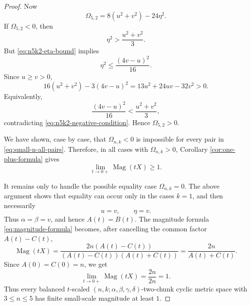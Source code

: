 \documentclass[11pt]{amsart}
\numberwithin{equation}{section}
\theoremstyle{definition}
\theoremstyle{remark}
\DeclareMathOperator{\Mag}{Mag}
\begin{document}
\begin{proof}
Now
\begin{equation}\label{eq:n5k2-Omega}
\Omega_{5,2}=8(u^2+v^2)-24\eta^2.
\end{equation}
If \(\Omega_{5,2}<0\), then
\begin{equation}\label{eq:n5k2-negative-condition}
\eta^2>\frac{u^2+v^2}{3}.
\end{equation}
But \eqref{eq:n5k2-eta-bound} implies
\begin{equation}\label{eq:n5k2-upper-square}
\eta^2\leq \frac{(4v-u)^2}{16}.
\end{equation}
Since \(u\geq v>0\),
\begin{equation}\label{eq:n5k2-elementary-positive}
16(u^2+v^2)-3(4v-u)^2
=
13u^2+24uv-32v^2
>0.
\end{equation}
Equivalently,
\begin{equation}\label{eq:n5k2-contradiction}
\frac{(4v-u)^2}{16}
<
\frac{u^2+v^2}{3},
\end{equation}
contradicting \eqref{eq:n5k2-negative-condition}.  Hence
\(\Omega_{5,2}>0\).

We have shown, case by case, that \(\Omega_{n,k}<0\) is impossible for every
pair in \eqref{eq:small-n-all-pairs}.  Therefore, in all cases with
\(\Omega_{n,k}>0\), Corollary \ref{cor:one-plus-formula} gives
\[
\lim_{t\to 0+}\Mag(tX)\geq 1.
\]

It remains only to handle the possible equality case \(\Omega_{n,k}=0\).
The above argument shows that equality can occur only in the cases \(k=1\),
and then necessarily
\begin{equation}\label{eq:k1-equality-case}
u=v,
\qquad
\eta=v.
\end{equation}
Thus \(\alpha=\beta=v\), and hence \(A(t)=B(t)\).  The magnitude formula
\eqref{eq:magnitude-formula} becomes, after cancelling the common factor
\(A(t)-C(t)\),
\begin{equation}\label{eq:k1-degenerate-cancellation}
\Mag(tX)
=
\frac{2n(A(t)-C(t))}{(A(t)-C(t))(A(t)+C(t))}
=
\frac{2n}{A(t)+C(t)}.
\end{equation}
Since \(A(0)=C(0)=n\), we get
\begin{equation}\label{eq:k1-degenerate-limit-final}
\lim_{t\to 0+}\Mag(tX)
=
\frac{2n}{2n}
=
1.
\end{equation}
Thus every balanced \(t\)-scaled \((n,k;\alpha,\beta,\gamma,\delta)\)-two-chunk cyclic metric space with
\(3\leq n\leq 5\) has finite small-scale magnitude at least \(1\).
\end{proof}
\end{document}
